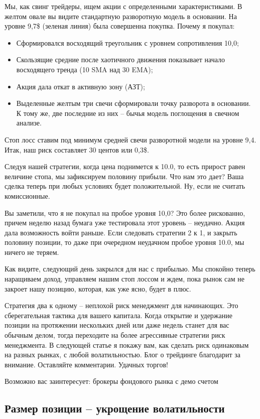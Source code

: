 \documentclass[a5paper]{article}
\begin{document}
Мы, как свинг трейдеры, ищем акции с определенными характеристиками. В желтом овале вы видите стандартную разворотную модель в основании. На уровне 9,7\$ (зеленая линия) была совершенна покупка. Почему я покупал:
\begin{itemize}
\item     Сформировался восходящий треугольник с уровнем сопротивления 10,0;
\item     Скользящие средние после хаотичного движения показывает начало восходящего тренда (10 SMA над 30 EMA);
\item     Акция дала откат в активную зону (АЗТ);
\item     Выделенные желтым три свечи сформировали точку разворота в основании. К тому же, две последние из них – бычья модель поглощения в свечном анализе.
\end{itemize}

Стоп лосс ставим под минимум средней свечи разворотной модели на уровне 9,4. Итак, наш риск составляет 30 центов или 0,3\$.

Следуя нашей стратегии, когда цена поднимется к 10.0, то есть прирост равен величине стопа, мы зафиксируем половину прибыли. Что нам это дает? Ваша сделка теперь при любых условиях будет положительной. Ну, если не считать комиссионные.

Вы заметили, что я не покупал на пробое уровня 10,0? Это более рискованно, причем неделю назад бумага уже тестировала этот уровень – неудачно. Акция дала возможность войти раньше. Если следовать стратегии 2 к 1, и закрыть половину позиции, то даже при очередном неудачном пробое уровня 10.0, мы ничего не теряем.

Как видите, следующий день закрылся для нас с прибылью. Мы спокойно теперь наращиваем доход, управляем нашим стоп лоссом и ждем, пока рынок сам не закроет нашу позицию, которая, как уже ясно, будет в плюс.

Стратегия два к одному – неплохой риск менеджмент для начинающих. Это сберегательная тактика для вашего капитала. Когда открытие и удержание позиции на протяжении нескольких дней или даже недель станет для вас обычным делом, тогда переходите на более агрессивные стратегии риск менеджмента. В следующей статье я покажу вам, как сделать риск одинаковым на разных рынках, с любой волатильностью. Блог о трейдинге благодарит за внимание. Оставляйте комментарии. Удачных торгов!


Возможно вас заинтересует: брокеры фондового рынка с демо счетом

\subsection{Размер позиции – укрощение волатильности}
\end{document}
